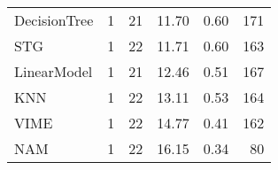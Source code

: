 \begin{tabular}{lrrrrr}
DecisionTree       &                  1 &  21 &  11.70 &                           0.60 &   171 \\
STG                &                  1 &  22 &  11.71 &                           0.60 &   163 \\
LinearModel        &                  1 &  21 &  12.46 &                           0.51 &   167 \\
KNN                &                  1 &  22 &  13.11 &                           0.53 &   164 \\
VIME               &                  1 &  22 &  14.77 &                           0.41 &   162 \\
NAM                &                  1 &  22 &  16.15 &                           0.34 &    80 \\
\bottomrule
\end{tabular}
